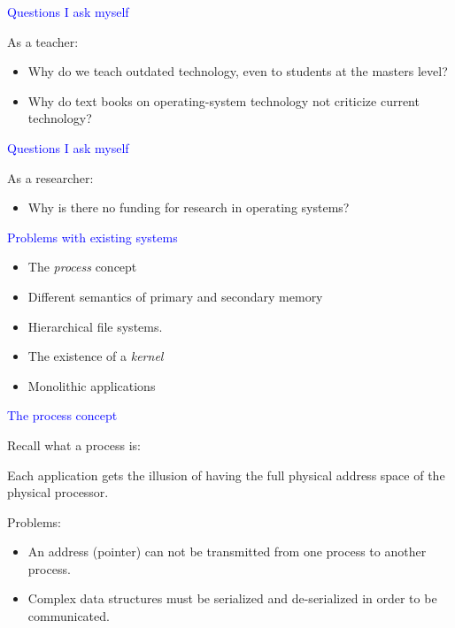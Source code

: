 \documentclass{slides}
\newcommand{\ti}[1]{\begin{center}\Large{\textcolor{blue}{#1}}\end{center}}
\begin{document}
\begin{slide}\ti{Questions I ask myself}
\vskip 0.5cm
As a teacher:

  \begin{itemize}
  \item Why do we teach outdated technology, even to students at the
    masters level?
  \item Why do text books on operating-system technology not criticize
    current technology?
  \end{itemize}

\vfill\end{slide}
\begin{slide}\ti{Questions I ask myself}
\vskip 0.5cm
As a researcher:

  \begin{itemize}
  \item Why is there no funding for research in operating systems?
  \end{itemize}

\vfill\end{slide}
\begin{slide}\ti{Problems with existing systems}
\vskip 0.5cm
\begin{itemize}
\item The \emph{process} concept
\item Different semantics of primary and secondary memory
\item Hierarchical file systems. 
\item The existence of a \emph{kernel}
\item Monolithic applications
\end{itemize}
\vfill\end{slide}
\begin{slide}\ti{The process concept}
\vskip 0.5cm
Recall what a process is:

Each application gets the illusion of having the full physical address
space of the physical processor.  

Problems:
\begin{itemize}
\item An address (pointer) can not be transmitted from one process to
  another process.
\item Complex data structures must be serialized and de-serialized in
  order to be communicated.
\end{itemize}
\vfill\end{slide}
\end{document}
